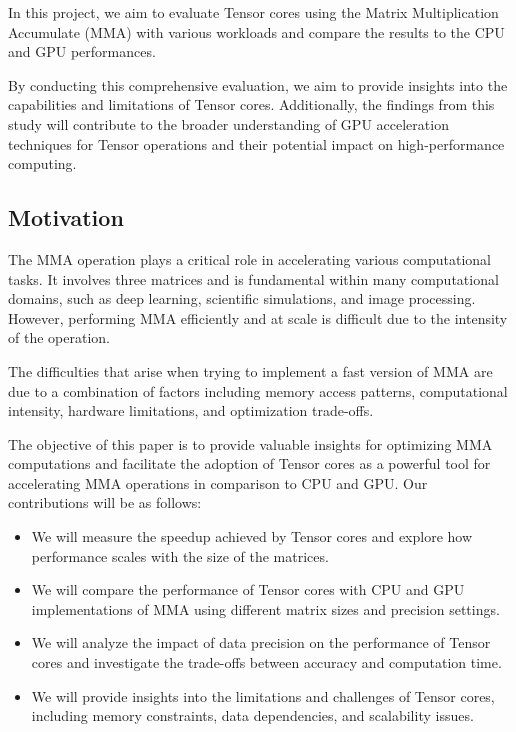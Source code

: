 \documentclass[conference]{IEEEtran}
\begin{document}
In this project, we aim to evaluate Tensor cores using the Matrix Multiplication Accumulate (MMA) with various 
workloads and compare the results to the CPU and GPU performances. 

By conducting this comprehensive evaluation, we aim to provide insights into the capabilities and 
limitations of Tensor cores. Additionally, the findings from this study will contribute to the 
broader understanding of GPU acceleration techniques for Tensor operations and their potential 
impact on high-performance computing.

\subsection{Motivation}\label{sec:Motivation}

The MMA operation plays a critical role in accelerating various computational tasks.
It involves three matrices and is fundamental within many computational domains, 
such as deep learning, scientific simulations, and image processing. However, performing MMA 
efficiently and at scale is difficult due to the intensity of the operation. 

The difficulties that arise when trying to implement a fast version of MMA are due to 
a combination of factors including memory access patterns, 
computational intensity, hardware limitations, and optimization trade-offs.

The objective of this paper is to provide valuable insights for optimizing MMA computations
and facilitate the adoption of Tensor cores as a powerful tool for accelerating MMA 
operations in comparison to CPU and GPU. Our contributions will be as follows:
\begin{itemize}
  \item We will measure the speedup achieved by Tensor cores and explore how 
  performance scales with the size of the matrices.

  \item We will compare the performance of Tensor cores with CPU and GPU implementations of MMA 
  using different matrix sizes and precision settings.
  
  \item We will analyze the impact of data precision on the performance of Tensor cores and 
  investigate the trade-offs between accuracy and computation time.

  
  \item We will provide insights into the limitations and challenges of Tensor cores, 
  including memory constraints, data dependencies, and scalability issues.
  
  \end{itemize}
  
\end{document}
